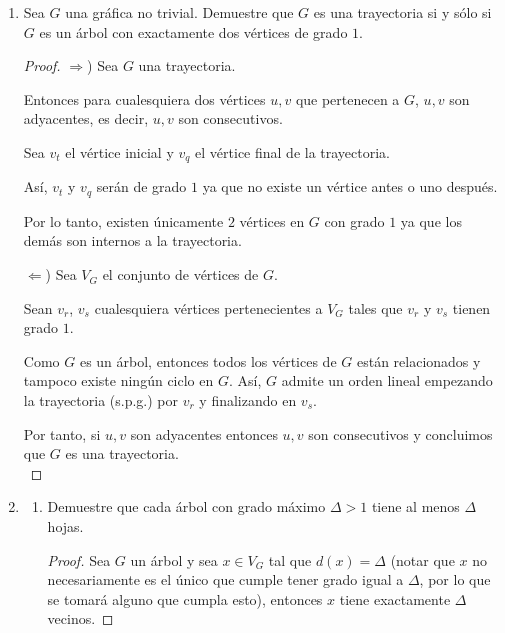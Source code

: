 \documentclass{article}
\begin{document}
\begin{enumerate}
  \item Sea $G$ una gr\'afica no trivial.   Demuestre
    que $G$ es una trayectoria si y s\'olo si $G$ es
    un \'arbol con exactamente dos v\'ertices de
    grado $1$.

    \begin{proof}
      $\Longrightarrow$) Sea $G$ una trayectoria.

      Entonces para cualesquiera dos vértices $u, v$ que pertenecen a $G$, $u, v$ son
      adyacentes, es decir, $u, v$ son consecutivos.

      Sea $v_t$ el vértice inicial y $v_q$ el vértice final de la trayectoria.

      Así, $v_t$ y $v_q$ serán de grado $1$ ya que no existe un vértice antes o
      uno después.

      Por lo tanto, existen únicamente $2$ vértices en $G$ con grado $1$ ya que
      los demás son internos a la trayectoria.

      $\Longleftarrow$) Sea  $V_G$ el conjunto de vértices de $G$.

      Sean $v_r$, $v_s$ cualesquiera vértices pertenecientes a $V_G$ tales que
      $v_r$ y $v_s$ tienen grado $1$.

      Como $G$ es un árbol, entonces todos los vértices de $G$ están relacionados
      y tampoco existe ningún ciclo en $G$. Así, $G$ admite un orden lineal
      empezando la trayectoria (s.p.g.) por $v_r$ y finalizando en $v_s$.

      Por tanto, si $u,v$ son adyacentes entonces $u,v$ son consecutivos y
      concluimos que $G$ es una trayectoria. \\
    \end{proof}

    \item \begin{enumerate}
      \item Demuestre que cada \'arbol con grado m\'aximo
        $\Delta > 1$ tiene al menos $\Delta$ hojas.

        \renewcommand\qedsymbol{QED}
        \begin{proof}
          Sea $G$ un \'arbol y sea $x \in V_G$ tal que $d(x) = \Delta$ (notar que $x$
          no necesariamente es el \'unico que cumple tener grado igual a $\Delta$, por
          lo que se tomar\'a alguno que cumpla esto), entonces $x$ tiene exactamente
          $\Delta$ vecinos.


\end{proof}
\end{enumerate}
\end{enumerate}
\end{document}
